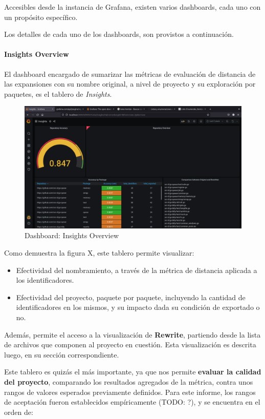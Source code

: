 Accesibles desde la instancia de Grafana, existen varios dashboards, cada uno con
un propósito específico.

Los detalles de cada uno de los dashboards, son provistos a continuación.

\paragraph{Insights Overview}
El dashboard encargado de sumarizar las métricas de evaluación de distancia de las
expansiones con su nombre original, a nivel de proyecto y su exploración por paquetes,
es el tablero de \textit{Insights}.

\begin{figure}[H]
  \includegraphics[width=12cm]{implementation/dashboard_insights_overview.png}
  \centering
  \caption{Dashboard: Insights Overview}
\end{figure}

Como demuestra la figura X, este tablero permite visualizar:

\begin{itemize}
  \item Efectividad del nombramiento, a través de la métrica de distancia aplicada
  a los identificadores.
  \item Efectividad del proyecto, paquete por paquete, incluyendo la cantidad de identificadores
  en los mismos, y su impacto dada su condición de exportado o no.
\end{itemize}

Además, permite el acceso a la visualización de \textbf{Rewrite}, partiendo desde la lista de archivos
que componen al proyecto en cuestión.
Esta visualización es descrita luego, en su sección correspondiente.

Este tablero es quizás el más importante, ya que nos permite \textbf{evaluar la calidad del proyecto},
comparando los resultados agregados de la métrica, contra unos rangos de valores esperados
previamente definidos.
Para este informe, los rangos de aceptación fueron establecidos empíricamente (TODO: ?),
y se encuentra en el orden de:


